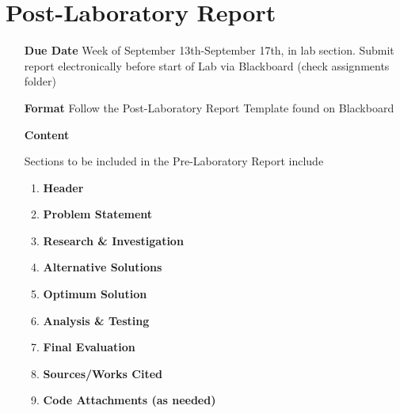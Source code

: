 \section{Post-Laboratory Report}

\begin{itemize}
	\item[\textbf{Due Date}]{Week of September 13th-September 17th, \the\year \space in lab section. Submit report electronically before start of Lab via Blackboard (check assignments folder)}
	\item[\textbf{Format}]{Follow the Post-Laboratory Report Template found on Blackboard}
	\item[\textbf{Content}]{Sections to be included in the Pre-Laboratory Report include
		\begin{enumerate}
			\item \textbf{Header}
			\item \textbf{Problem Statement}
			\item \textbf{Research \& Investigation}
			\item \textbf{Alternative Solutions}
			\item \textbf{Optimum Solution}
			\item \textbf{Analysis \& Testing}
			\item \textbf{Final Evaluation}
			\item \textbf{Sources/Works Cited}
			\item \textbf{Code Attachments (as needed)}
		\end{enumerate}
		
	}
\end{itemize}
